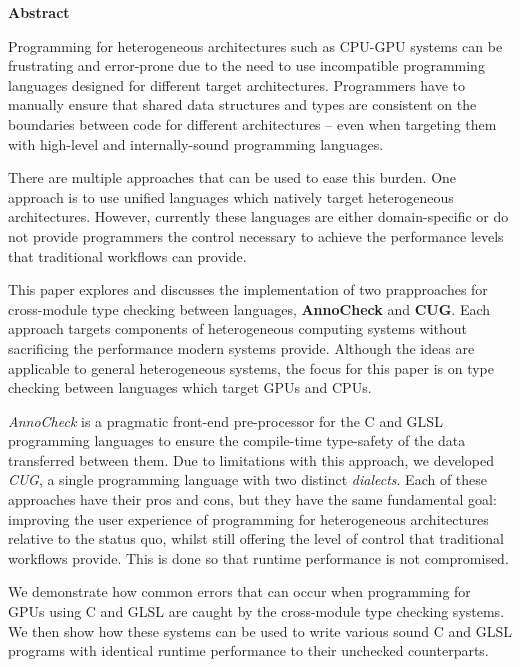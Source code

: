 \newpage
{\Huge \bf Abstract}
\vspace{24pt}






Programming for heterogeneous architectures such as CPU-GPU systems can be
frustrating and error-prone due to the need to use incompatible programming
languages designed for different target architectures. Programmers have to
manually ensure that shared data structures and types are consistent on the
boundaries between code for different architectures -- even when targeting them
with high-level and internally-sound programming languages.

There are multiple approaches that can be used to ease this burden. One
approach is to use unified languages which natively target heterogeneous
architectures. However, currently these languages are either domain-specific or
do not provide programmers the control necessary to achieve the performance
levels that traditional workflows can provide.

This paper explores and discusses the implementation of two prapproaches for
cross-module type checking between languages, \textbf{AnnoCheck} and
\textbf{CUG}. Each approach targets components of heterogeneous computing
systems without sacrificing the performance modern systems provide. Although
the ideas are applicable to general heterogeneous systems, the focus for this
paper is on type checking between languages which target GPUs and CPUs.

\textit{AnnoCheck} is a pragmatic front-end pre-processor for the C and GLSL
programming languages to ensure the compile-time type-safety of the data
transferred between them. Due to limitations with this approach, we developed
\textit{CUG}, a single programming language with two distinct
\textit{dialects}. Each of these approaches have their pros and cons, but they
have the same fundamental goal: improving the user experience of programming
for heterogeneous architectures relative to the status quo, whilst still
offering the level of control that traditional workflows provide. This is done
so that runtime performance is not compromised.

We demonstrate how common errors that can occur when programming for GPUs using
C and GLSL are caught by the cross-module type checking systems. We then show
how these systems can be used to write various sound C and GLSL programs with
identical runtime performance to their unchecked counterparts.

\newpage
\vspace*{\fill}
